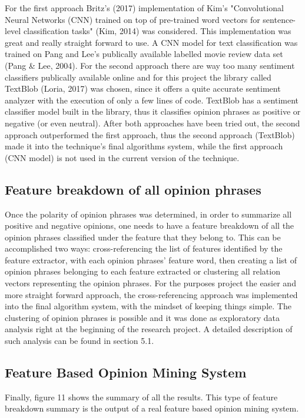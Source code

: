 \documentclass{sig-alternate}
\begin{document}
For the first approach Britz's (2017) implementation of Kim's "Convolutional Neural Networks (CNN) trained on top of pre-trained word vectors for sentence-level classification tasks" (Kim, 2014)  was considered. This implementation was great and really straight forward to use. A CNN model for text classification was trained on Pang and Lee's publically available labelled movie review data set (Pang \& Lee, 2004). 
For the second approach there are way too many sentiment classifiers publically available online and for this project the library called TextBlob (Loria, 2017) was chosen, since it offers a quite accurate sentiment analyzer with the execution of only a few lines of code. TextBlob has a sentiment classifier model built in the library, thus it classifies opinion phrases as positive or negative (or even neutral).
After both approaches have been tried out, the second approach outperformed the first approach, thus the second approach (TextBlob) made it into the technique's final algorithms system, while the first approach (CNN model) is not used in the current version of the technique.

\subsection{Feature breakdown of all opinion phrases}
Once the polarity of opinion phrases was determined, in order to summarize all positive and negative opinions, one needs to have a feature breakdown of all the opinion phrases classified under the feature that they belong to. This can be accomplished two ways: cross-referencing the list of features identified by the feature extractor, with each opinion phrases' feature word, then creating a list of opinion phrases belonging to each feature extracted or clustering all relation vectors representing the opinion phrases. For the purposes project the easier and more straight forward approach, the cross-referencing approach was implemented into the final algorithm system, with the mindset of keeping things simple. The clustering of opinion phrases is possible and it was done as exploratory data analysis right at the beginning of the research project. A detailed description of such analysis can be found in section 5.1. 

\subsection{Feature Based Opinion Mining System}
Finally, figure 11 shows the summary of all the results. This type of feature breakdown summary is the output of a real feature based opinion mining system.
\end{document}
